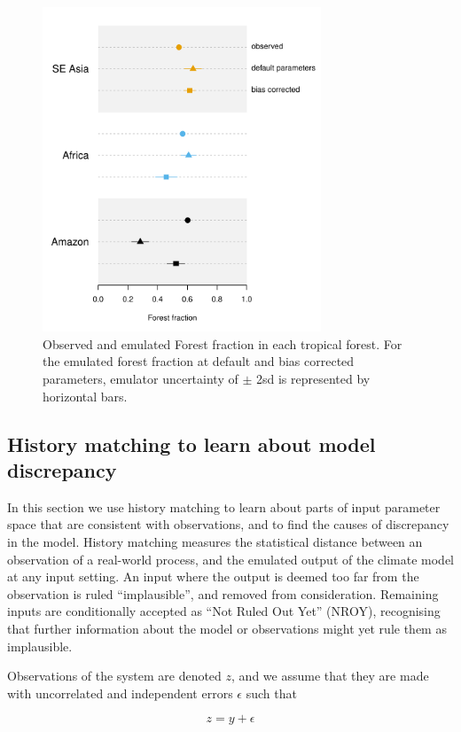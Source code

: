 \documentclass[gmd, manuscript]{copernicus}
\begin{document}
\begin{figure}[t]
\includegraphics[width=8.3cm]{../graphics/dotchart_fractions.pdf}
\caption{Observed and emulated Forest fraction in each tropical forest. For the emulated forest fraction at default and bias corrected parameters, emulator uncertainty of $\pm$ 2sd is represented by horizontal bars.
}
\label{fig:dotchart_fractions}
\end{figure}


\subsection{History matching to learn about model discrepancy}\label{ssec:history_matching}
In this section we use history matching to learn about parts of input parameter space that are consistent with observations, and to find the causes of discrepancy in the model. History matching measures the statistical distance between an observation of a real-world process, and the emulated output of the climate model at any input setting. An input where the output is deemed too far from the observation is ruled ``implausible'', and removed from consideration. Remaining inputs are conditionally accepted as ``Not Ruled Out Yet'' (NROY), recognising that further information about the model or observations might yet rule them as implausible.

Observations of the system are denoted $z$, and we assume that they are made with uncorrelated and independent errors $\epsilon$  such that

\begin{equation}
z = y+\epsilon
\end{equation}
\end{document}
